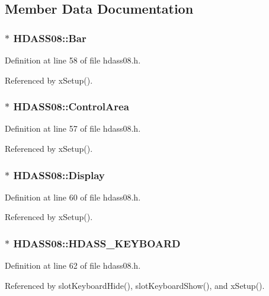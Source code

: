 \subsection{Member Data Documentation}
\subsubsection{$\ast$ {\bf HDASS08::Bar}}\label{classHDASS08_HDASS08o1}




Definition at line 58 of file hdass08.h.

Referenced by x\-Setup().
\subsubsection{$\ast$ {\bf HDASS08::Control\-Area}}\label{classHDASS08_HDASS08o0}




Definition at line 57 of file hdass08.h.

Referenced by x\-Setup().
\subsubsection{$\ast$ {\bf HDASS08::Display}}\label{classHDASS08_HDASS08o2}




Definition at line 60 of file hdass08.h.

Referenced by x\-Setup().
\subsubsection{$\ast$ {\bf HDASS08::HDASS\_\-KEYBOARD}}\label{classHDASS08_HDASS08o4}




Definition at line 62 of file hdass08.h.

Referenced by slot\-Keyboard\-Hide(), slot\-Keyboard\-Show(), and x\-Setup().

